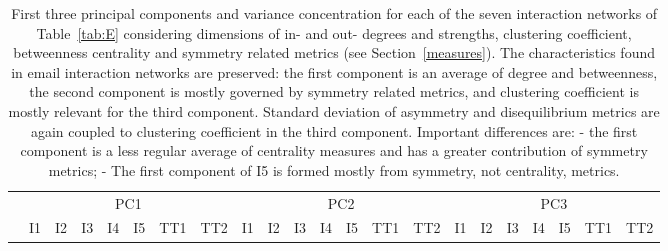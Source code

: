 \documentclass[%
	aip,
	jmp,%
	amsmath,amssymb,
	reprint,%
	floatfix,
]{revtex4-1}
\begin{document}
								\begin{table}[!h]
									\caption{First three principal components and variance concentration for each of the seven interaction networks of Table~\ref{tab:E} considering dimensions of in- and out- degrees and strengths, clustering coefficient, betweenness centrality and symmetry related metrics (see Section~\ref{measures}). The characteristics found in email interaction networks are preserved: the first component is an average of degree and betweenness, the second component is mostly governed by symmetry related metrics, and clustering coefficient is mostly relevant for the third component. Standard deviation of asymmetry and disequilibrium metrics are again coupled to clustering coefficient in the third component. Important differences are: - the first component is a less regular average of centrality measures and has a greater contribution of symmetry metrics; - The first component of I5 is formed mostly from symmetry, not centrality, metrics.}
									\footnotesize
									\begin{center}
										\begin{tabular}{| l ||  c |c |c |c |c | c | c || c | c | c | c | c | c | c || c |c |c |c |c | c | c |	}\cline{2-22}
											\multicolumn{1}{c|}{} & \multicolumn{7}{c||}{PC1}          & \multicolumn{7}{c||}{PC2} & \multicolumn{7}{c|}{PC3}  \\\cline{2-22}
											\multicolumn{1}{c|}{} & 
											I1 & I2 & I3 & I4 & I5 & TT1 & TT2 &
											I1 & I2 & I3 & I4 & I5 & TT1 & TT2 &
											I1 & I2 & I3 & I4 & I5 & TT1 & TT2 \\\hline
											
											\hline
										\end{tabular}
									\end{center}
									\label{tab:pcaE3}
								\end{table}









								\clearpage
								\nocite{*}
								
\end{document}
